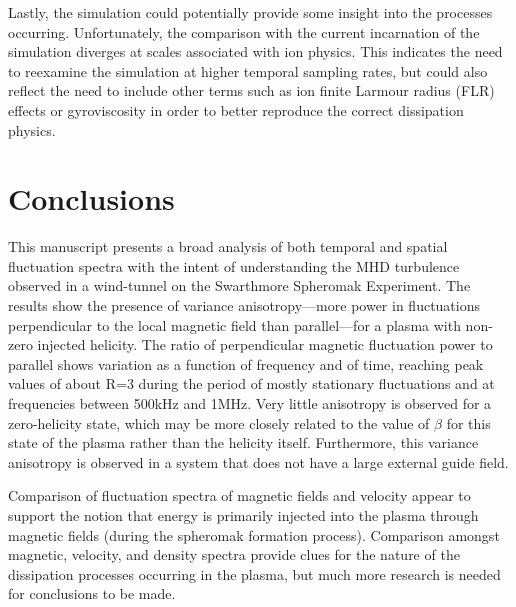 \documentclass[manuscript]{aastex}
\begin{document}
Lastly, the simulation could potentially provide some insight into the processes occurring. Unfortunately, the comparison with the current incarnation of the simulation diverges at scales associated with ion physics. This indicates the need to reexamine the simulation at higher temporal sampling rates, but could also reflect the need to include other terms such as ion finite Larmour radius (FLR) effects or gyroviscosity in order to better reproduce the correct dissipation physics.


\section{Conclusions}\label{sec:conclusions}

This manuscript presents a broad analysis of both temporal and spatial fluctuation spectra with the intent of understanding the MHD turbulence observed in a wind-tunnel on the Swarthmore Spheromak Experiment. The results show the presence of variance anisotropy---more power in fluctuations perpendicular to the local magnetic field than parallel---for a plasma with non-zero injected helicity. The ratio of perpendicular magnetic fluctuation power to parallel shows variation as a function of frequency and of time, reaching peak values of about R=3 during the period of mostly stationary fluctuations and at frequencies between 500kHz and 1MHz. Very little anisotropy is observed for a zero-helicity state, which may be more closely related to the value of $\beta$ for this state of the plasma rather than the helicity itself. Furthermore, this variance anisotropy is observed in a system that does not have a large external guide field. 

Comparison of fluctuation spectra of magnetic fields and velocity appear to support the notion that energy is primarily injected into the plasma through magnetic fields (during the spheromak formation process). Comparison amongst magnetic, velocity, and density spectra provide clues for the nature of the dissipation processes occurring in the plasma, but much more research is needed for conclusions to be made.
\end{document}
